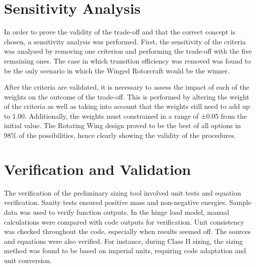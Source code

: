 \section*{Sensitivity Analysis}
In order to prove the validity of the trade-off and that the correct concept is chosen, a sensitivity analysis was performed.
First, the sensitivity of the criteria was analysed by removing one criterion and performing the trade-off with the five remaining ones. The case in which transition efficiency was removed was found to be the only scenario in which the Winged Rotorcraft would be the winner.

After the criteria are validated, it is necessary to assess the impact of each of the weights on the outcome of the trade-off.
This is performed by altering the weight of the criteria as well as taking into account that the weights still need to add up to 1.00. Additionally, the weights must constrained in a range of ±0.05 from the initial value. The Rotating Wing design proved to
be the best of all options in 98\% of the possibilities, hence clearly showing the validity of the procedures.


\section*{Verification and Validation}

The verification of the preliminary sizing tool involved unit tests and equation verification.
Sanity tests ensured positive mass and non-negative energies.
Sample data was used to verify function outputs.
In the hinge load model, manual calculations were compared with code outputs for verification.
Unit consistency was checked throughout the code, especially when results seemed off.
The sources and equations were also verified.
For instance, during Class II sizing, the sizing method was found to be based on imperial units, requiring code adaptation and unit conversion.

